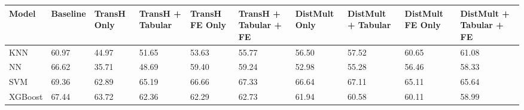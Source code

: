 \begin{tabular}{llllllllll}
\toprule
Model & Baseline & TransH Only & TransH + Tabular & TransH FE Only & TransH + Tabular + FE & DistMult Only & DistMult + Tabular & DistMult FE Only & DistMult + Tabular + FE \\
\midrule
KNN & 60.97 & 44.97 & 51.65 & 53.63 & 55.77 & 56.50 & 57.52 & 60.65 & 61.08 \\
NN & 66.62 & 35.71 & 48.69 & 59.40 & 59.24 & 52.98 & 55.28 & 56.46 & 58.33 \\
SVM & 69.36 & 62.89 & 65.19 & 66.66 & 67.33 & 66.64 & 67.11 & 65.11 & 65.64 \\
XGBoost & 67.44 & 63.72 & 62.36 & 62.29 & 62.73 & 61.94 & 60.58 & 60.11 & 58.99 \\
\bottomrule
\end{tabular}
